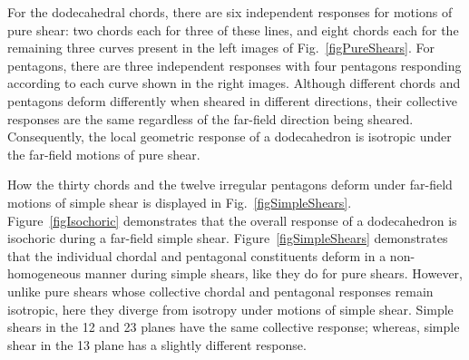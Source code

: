 For the dodecahedral chords, there are six independent responses for motions of pure shear: two chords each for three of these lines, and eight chords each for the remaining three curves present in the left images of Fig.~\ref{figPureShears}.  For pentagons, there are three independent responses with four pentagons responding according to each curve shown in the right images.  Although different chords and pentagons deform differently when sheared in different directions, their collective responses are the same regardless of the far-field direction being sheared.  Consequently, the local geometric response of a dodecahedron is isotropic under the far-field motions of pure shear.  

How the thirty chords and the twelve irregular pentagons deform under far-field motions of simple shear is displayed in Fig.~\ref{figSimpleShears}.  Figure~\ref{figIsochoric} demonstrates that the overall response of a dodecahedron is isochoric during a far-field simple shear. Figure~\ref{figSimpleShears} demonstrates that the individual chordal and pentagonal constituents deform in a non-homogeneous manner during simple shears, like they do for pure shears.  However, unlike pure shears whose collective chordal and pentagonal responses remain isotropic, here they diverge from isotropy under motions of simple shear.  Simple shears in the 12 and 23 planes have the same collective response; whereas, simple shear in the 13 plane has a slightly different response.  

